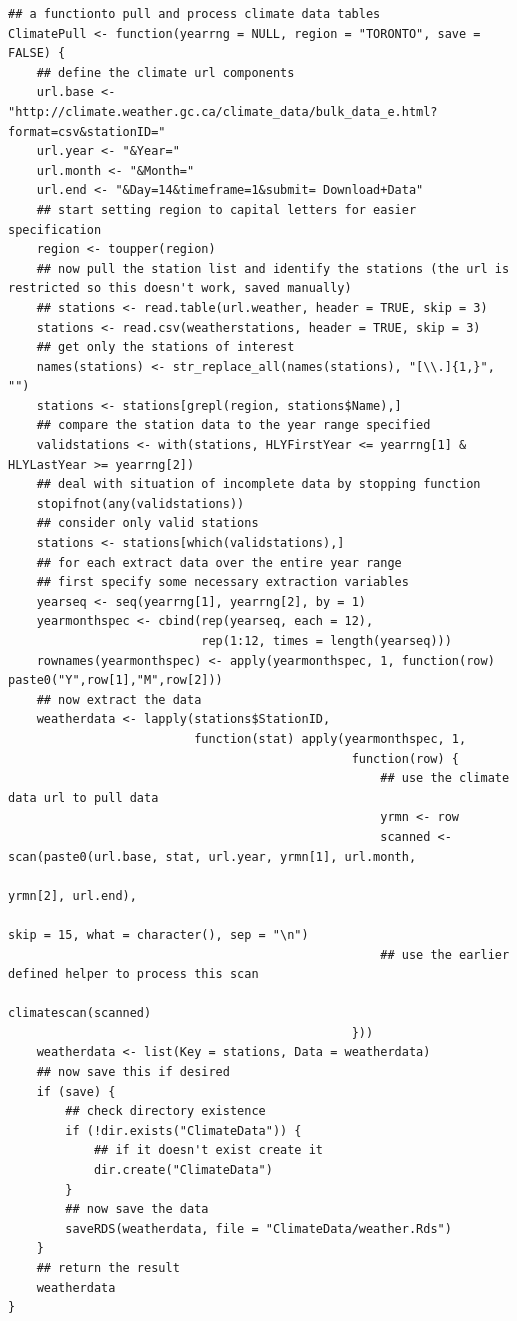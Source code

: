 \documentclass{article}
\begin{document}
\begin{lstlisting}
## a functionto pull and process climate data tables
ClimatePull <- function(yearrng = NULL, region = "TORONTO", save = FALSE) {
    ## define the climate url components
    url.base <- "http://climate.weather.gc.ca/climate_data/bulk_data_e.html?format=csv&stationID="
    url.year <- "&Year="
    url.month <- "&Month="
    url.end <- "&Day=14&timeframe=1&submit= Download+Data"
    ## start setting region to capital letters for easier specification
    region <- toupper(region)
    ## now pull the station list and identify the stations (the url is restricted so this doesn't work, saved manually)
    ## stations <- read.table(url.weather, header = TRUE, skip = 3)
    stations <- read.csv(weatherstations, header = TRUE, skip = 3)
    ## get only the stations of interest
    names(stations) <- str_replace_all(names(stations), "[\\.]{1,}", "")
    stations <- stations[grepl(region, stations$Name),]
    ## compare the station data to the year range specified
    validstations <- with(stations, HLYFirstYear <= yearrng[1] & HLYLastYear >= yearrng[2])
    ## deal with situation of incomplete data by stopping function
    stopifnot(any(validstations))
    ## consider only valid stations
    stations <- stations[which(validstations),]
    ## for each extract data over the entire year range
    ## first specify some necessary extraction variables
    yearseq <- seq(yearrng[1], yearrng[2], by = 1)
    yearmonthspec <- cbind(rep(yearseq, each = 12),
                           rep(1:12, times = length(yearseq)))
    rownames(yearmonthspec) <- apply(yearmonthspec, 1, function(row) paste0("Y",row[1],"M",row[2]))
    ## now extract the data
    weatherdata <- lapply(stations$StationID,
                          function(stat) apply(yearmonthspec, 1,
                                                function(row) {
                                                    ## use the climate data url to pull data
                                                    yrmn <- row
                                                    scanned <- scan(paste0(url.base, stat, url.year, yrmn[1], url.month,
                                                                           yrmn[2], url.end),
                                                                    skip = 15, what = character(), sep = "\n")
                                                    ## use the earlier defined helper to process this scan
                                                    climatescan(scanned)
                                                }))
    weatherdata <- list(Key = stations, Data = weatherdata)
    ## now save this if desired
    if (save) {
        ## check directory existence
        if (!dir.exists("ClimateData")) {
            ## if it doesn't exist create it
            dir.create("ClimateData")
        }
        ## now save the data
        saveRDS(weatherdata, file = "ClimateData/weather.Rds")
    }
    ## return the result
    weatherdata
}


\end{lstlisting}
\end{document}
